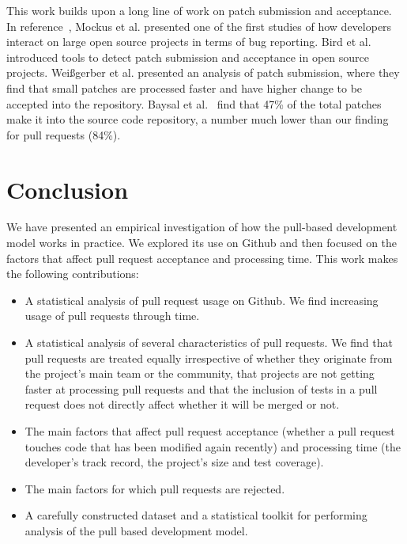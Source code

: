\documentclass{sig-alternate}
\begin{document}
This work builds upon a long line of work on patch submission and acceptance.
In reference~\cite{MOCKU02}, Mockus et al. presented one of the first studies of
how developers interact on large open source projects in terms of bug reporting.
Bird et al.~\cite{Bird07a} introduced tools to detect patch submission and
acceptance in open source projects. Wei\ss gerber et al. presented an analysis
of patch submission, where they find that small patches are processed faster and
have higher change to be accepted into the repository. Baysal et
al.~\cite{Baysa12} find that 47\% of the total patches make it into the source
code repository, a number much lower than our finding for pull requests (84\%).

\section{Conclusion}

We have presented an empirical investigation of how the pull-based development
model works in practice. We explored its use on Github
and then focused on the factors that affect pull request acceptance
and processing time. This work makes the following contributions:

\begin{itemize}

  \item A statistical analysis of pull request usage on Github.
    We find increasing usage of pull requests through time.

  \item A statistical analysis of several characteristics of pull requests. We
    find that pull requests are treated equally irrespective of whether they
    originate from the project's main team or the community, that projects are
    not getting faster at processing pull requests and that the inclusion of
    tests in a pull request does not directly affect whether it will be merged
    or not.

  \item The main factors that affect pull request acceptance (whether a pull
    request touches code that has been modified again recently) and processing
    time (the developer's track record, the project's size and test coverage).
  

  \item The main factors for which pull requests are rejected.

  \item A carefully constructed dataset and a statistical toolkit for
    performing analysis of the pull based development model.

\end{itemize}
\end{document}

